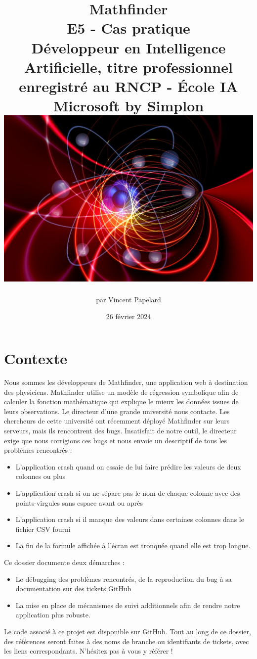 \documentclass[french]{article}
\title{%
    \huge Mathfinder  \\
    \bigskip
    \large E5 - Cas pratique \\ 
    Développeur en Intelligence Artificielle,
    titre professionnel enregistré au RNCP - École IA Microsoft by Simplon
    \vfill
    \includegraphics[width=14cm]{physics.jpg} %
    \vfill}
\date{26 février 2024}
\author{par Vincent Papelard}
\begin{document}
    \maketitle
    \newpage
    \newpage

    \section{Contexte}
    Nous sommes les développeurs de Mathfinder, une application web à destination des physiciens. Mathfinder utilise un modèle de régression symbolique afin de calculer la fonction mathématique qui explique le mieux les données issues de leurs observations.
    Le directeur d'une grande université nous contacte. Les chercheurs de cette université ont récemment déployé Mathfinder sur leurs serveurs, mais ils rencontrent des bugs. Insatisfait de notre outil, le directeur exige que nous corrigions ces bugs et nous envoie un descriptif de tous les problèmes rencontrés :
    \begin{itemize}
        \item L'application crash quand on essaie de lui faire prédire les valeurs de deux colonnes ou plus
        \item L'application crash si on ne sépare pas le nom de chaque colonne avec des points-virgules sans espace avant ou après
        \item L'application crash si il manque des valeurs dans certaines colonnes dans le fichier CSV fourni
        \item La fin de la formule affichée à l'écran est tronquée quand elle est trop longue.
    \end{itemize}

    Ce dossier documente deux démarches :
    \begin{itemize}
        \item Le débugging des problèmes rencontrés, de la reproduction du bug à sa documentation sur des tickets GitHub
        \item La mise en place de mécanismes de suivi additionnels afin de rendre notre application plus robuste.
    \end{itemize}
    Le code associé à ce projet est disponible \href{https://github.com/vinpap/mathfinder}{sur GitHub}. Tout au long de ce dossier, des références seront faites à des noms de branche ou identifiants de tickets, avec les liens correspondants. N'hésitez pas à vous y référer !
\end{document}
